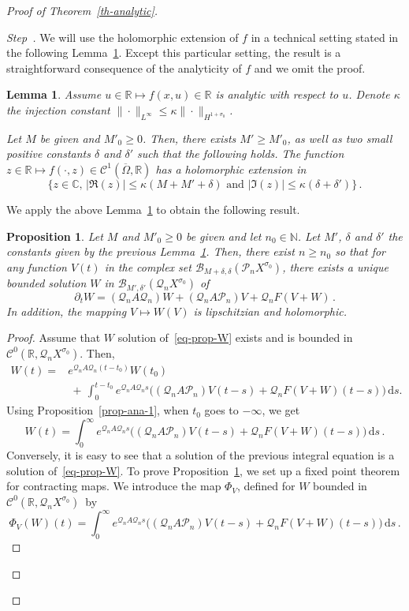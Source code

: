 \documentclass[10pt]{amsart}
\newtheorem{lemm}[theo]{Lemma}\newtheorem{prop}[theo]{Proposition}\newtheorem{coro}[theo]{Corollary}\newtheorem{conj}[theo]{Conjecture}
\theoremstyle{definition}\newtheorem{defi}[theo]{Definition}\newtheorem{rema}[theo]{Remark}\newtheorem{exam}[theo]{Example}\newtheorem{exem}[theo]{Example}\newtheorem{nota}[theo]{Notation}
\newcommand{\RR}{\mathbb{R}}
\newcommand{\NN}{\mathbb{N}}
\newcommand{\CC}{\mathbb{C}}
\newcommand{\Cc}{\mathcal{C}}
\newcommand{\Bc}{\mathcal{B}}
\newcommand{\Pc}{\mathcal{P}}
\newcommand{\Qc}{\mathcal{Q}}
\newcommand{\drm}{\mathrm{d}}
\newcounter{stepcount}
\newenvironment{step}{\refstepcounter{stepcount}\begin{proof}[Step~\thestepcount]}{\let\qed\relax\end{proof}}
\begin{document}
\begin{proof}[{Proof of Theorem~\ref{th-analytic}}]
\begin{step}
We will use the holomorphic extension of $f$ in a technical setting stated in the following Lemma~\ref{lemm10.3}. Except this particular setting, the result is a straightforward consequence of the analyticity of $f$ and we omit the proof.
\begin{lemm}\label{lemm10.3}
Assume $u\in\RR \mapsto f(x,u)\in\RR$ is analytic with respect to $u$. Denote $\kappa$ the injection constant $\|\cdot\|_{L^\infty}\leq \kappa
\|\cdot\|_{H^{1+\sigma_0}}$.

Let $M$ be given and $M'_0\geq 0$. Then, there exists $M'\geq M'_0$, as well as two small positive constants $\delta$ and $\delta'$ such that the following holds. The function $z\in\RR \mapsto f(\cdot,z)\in \Cc^1(\overline\Omega,\RR)$ has a holomorphic extension in 
\[
\big\{z\in\CC,\,|\Re(z)|\leq \kappa(M+M'+\delta)\text{ and }|\Im(z)|\leq \kappa(\delta+\delta')\big\}\,.
\]
\end{lemm}

We apply the above Lemma~\ref{lemm10.3} to obtain the following result.

\begin{prop}\label{prop-W}
Let $M$ and $M'_0\geq 0$ be given and let $n_0\in\NN$. Let $M'$, $\delta$ and $\delta'$ the constants given by the previous Lemma~\ref{lemm10.3}. Then, there exist $n\geq n_0$ so that for any function $V(t)$ in the complex set $\Bc_{M+\delta,\delta}(\Pc_nX^{\sigma_0})$, there exists a unique bounded solution $W$ in $\Bc_{M',\delta'}(\Qc_nX^{\sigma_0})$ of
\begin{equation}\label{eq-prop-W}
\partial_t W = (\Qc_nA\Qc_n) W + (\Qc_nA\Pc_n) V+\Qc_n F(V+W)\,.
\end{equation}
In addition, the mapping $V\mapsto W(V)$ is lipschitzian and holomorphic.
\end{prop}
\begin{proof}
Assume that $W$ solution of~\eqref{eq-prop-W} exists and is bounded in $\Cc^0(\RR,\Qc_nX^{\sigma_0})$. Then,
\begin{align*}
W(t)=&e^{\Qc_n A\Qc_n (t-t_0)}W(t_0) \\
&\:+\,\int_{0}^{t-t_0} e^{\Qc_n A\Qc_n s}\big((\Qc_nA\Pc_n) V(t-s)+\Qc_n F(V+W)(t-s)\big)\,\drm s.
\end{align*}
Using Proposition~\ref{prop-ana-1}, when $t_0$ goes to $-\infty$, we get
\[
W(t)= \int_{0}^\infty e^{\Qc_n A\Qc_n s}\big((\Qc_nA\Pc_n)
V(t-s)+\Qc_n F(V+W)(t-s)\big)\,\drm s\,.
\]
Conversely, it is easy to see that a solution of the previous integral equation is a solution of~\eqref{eq-prop-W}. To prove Proposition~\ref{prop-W}, we set up a fixed point theorem for contracting maps. We introduce the map $\Phi_{V}$, defined for $W$ bounded in $\Cc^0(\RR,\Qc_nX^{\sigma_0})$~by
\[
\Phi_{V}(W)(t)=\int_0^\infty e^{\Qc_n A\Qc_n
s}\big((\Qc_nA\Pc_n)V(t-s)+\Qc_n F(V+W)(t-s)\big)\,\drm s\,.
\]


\end{proof}
\end{step}
\end{proof}
\end{document}
